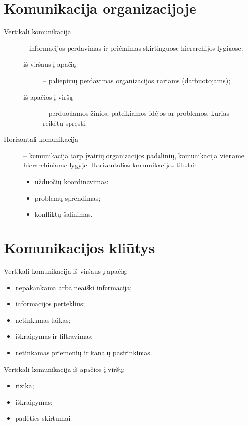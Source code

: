 \section{Komunikacija organizacijoje}

\begin{description}
  \item[Vertikali komunikacija] – informacijos perdavimas ir priėmimas
    skirtinguose hierarchijos lygiuose:
    \begin{description}
      \item[iš viršaus į apačią] – paliepimų perdavimas organizacijos
        nariams (darbuotojams);
      \item[iš apačios į viršų] – perduodamos žinios, pateikiamos idėjos
        ar problemos, kurias reikėtų spręsti.
    \end{description}
  \item[Horizontali komunikacija] – komunikacija tarp įvairių organizacijos
    padalinių, komunikacija viename hierarchiniame lygyje. Horizontalios
    komunikacijos tikslai:
    \begin{itemize}
      \item užduočių koordinavimas;
      \item problemų sprendimas;
      \item konfliktų šalinimas.
    \end{itemize}
\end{description}

\section{Komunikacijos kliūtys}

Vertikali komunikacija iš viršaus į apačią:
\begin{itemize}
  \item nepakankama arba neaiški informacija;
  \item informacijos perteklius;
  \item netinkamas laikas;
  \item iškraipymas ir filtravimas;
  \item netinkamas priemonių ir kanalų pasirinkimas.
\end{itemize}

Vertikali komunikacija iš apačios į viršų:
\begin{itemize}
  \item rizika;
  \item iškraipymas;
  \item padėties skirtumai.
\end{itemize}

